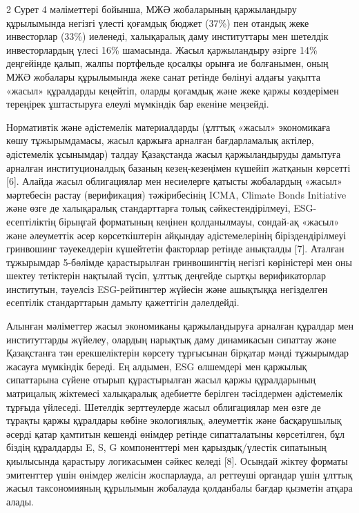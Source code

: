 \begin{multicols}{2}
Сурет 4 мәліметтері бойынша, МЖӘ жобаларының қаржыландыру құрылымында
негізгі үлесті қоғамдық бюджет (37\%) пен отандық жеке инвесторлар
(33\%) иеленеді, халықаралық даму институттары мен шетелдік
инвесторлардың үлесі 16\% шамасында. Жасыл қаржыландыру әзірге 14\%
деңгейінде қалып, жалпы портфельде қосалқы орынға ие болғанымен, оның
МЖӘ жобалары құрылымында жеке санат ретінде бөлінуі алдағы уақытта
«жасыл» құралдарды кеңейтіп, оларды қоғамдық және жеке қаржы көздерімен
тереңірек ұштастыруға елеулі мүмкіндік бар екеніне меңзейді.

Нормативтік және әдістемелік материалдарды (ұлттық «жасыл» экономикаға
көшу тұжырымдамасы, жасыл қаржыға арналған бағдарламалық актілер,
әдістемелік ұсынымдар) талдау Қазақстанда жасыл қаржыландыруды дамытуға
арналған институционалдық базаның кезең-кезеңімен күшейіп жатқанын
көрсетті {[}6{]}. Алайда жасыл облигациялар мен несиелерге қатысты
жобалардың «жасыл» мәртебесін растау (верификация) тәжірибесінің ICMA,
Climate Bonds Initiative және өзге де халықаралық стандарттарға толық
сәйкестендірілмеуі, ESG-есептіліктің бірыңғай форматының кеңінен
қолданылмауы, сондай-ақ «жасыл» және әлеуметтік әсер көрсеткіштерін
айқындау әдістемелерінің біріздендірілмеуі гринвошинг тәуекелдерін
күшейтетін факторлар ретінде анықталды {[}7{]}. Аталған тұжырымдар
5-бөлімде қарастырылған гринвошингтің негізгі көріністері мен оны шектеу
тетіктерін нақтылай түсіп, ұлттық деңгейде сыртқы верификаторлар
институтын, тәуелсіз ESG-рейтингтер жүйесін және ашықтыққа негізделген
есептілік стандарттарын дамыту қажеттігін дәлелдейді.

Алынған мәліметтер жасыл экономиканы қаржыландыруға арналған құралдар
мен институттарды жүйелеу, олардың нарықтық даму динамикасын сипаттау
және Қазақстанға тән ерекшеліктерін көрсету тұрғысынан бірқатар мәнді
тұжырымдар жасауға мүмкіндік береді. Ең алдымен, ESG өлшемдері мен
қаржылық сипаттарына сүйене отырып құрастырылған жасыл қаржы
құралдарының матрицалық жіктемесі халықаралық әдебиетте берілген
тәсілдермен әдістемелік тұрғыда үйлеседі. Шетелдік зерттеулерде жасыл
облигациялар мен өзге де тұрақты қаржы құралдары көбіне экологиялық,
әлеуметтік және басқарушылық әсерді қатар қамтитын кешенді өнімдер
ретінде сипатталатыны көрсетілген, бұл біздің құралдарды E, S, G
компоненттері мен қарыздық/үлестік сипатының қиылысында қарастыру
логикасымен сәйкес келеді {[}8{]}. Осындай жіктеу форматы эмитенттер
үшін өнімдер желісін жоспарлауда, ал реттеуші органдар үшін ұлттық жасыл
таксономияның құрылымын жобалауда қолданбалы бағдар қызметін атқара
алады.


\end{multicols}
